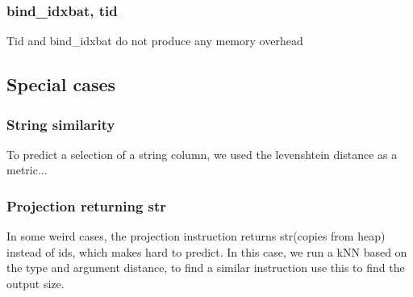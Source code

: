 \subsubsection{bind\_idxbat, tid}
Tid and bind\_idxbat do not produce any memory overhead

\subsection{Special cases}
\subsubsection{String similarity}
To predict a selection of a string column,
we used the levenshtein distance as a metric...
\subsubsection{Projection returning str}
In some weird cases, the projection instruction
returns str(copies from heap) instead of ids,
which makes hard to predict. In this case, we run a kNN
based on the type and argument distance, to find a similar
instruction use this to find the output size.
